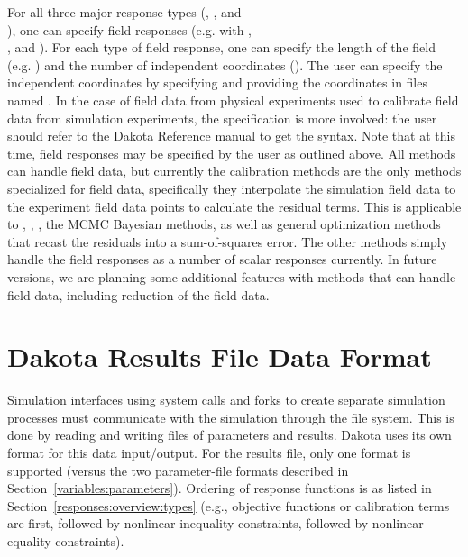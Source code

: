 For all three major response types (,
, and\\), one
can specify field responses (e.g. with ,\\
, and ).
For each type of field response, one can specify the length
of the field (e.g. ) and the number of
independent coordinates ().
The user can specify the independent coordinates by specifying
 and providing the coordinates in files
named .  In the case of field data
from physical experiments used to calibrate field data from simulation
experiments, the specification is more involved:  the user should refer
to the Dakota Reference manual to get the syntax.  Note that at this
time, field responses may be specified by the user as outlined above.
All methods can handle field data, but currently the calibration methods
are the only methods specialized for field data, specifically they
interpolate the simulation field data to the experiment field data points
to calculate the residual terms.  This is applicable to ,
, , the MCMC Bayesian methods,
as well as general optimization methods that recast the residuals into
a sum-of-squares error.  The other methods simply handle the field
responses as a number of scalar responses currently. In future versions,
we are planning some additional features with methods that can handle
field data, including reduction of the field data.

\section{Dakota Results File Data Format}\label{responses:results}

Simulation interfaces using system calls and forks to create
separate simulation processes must communicate with the simulation
through the file system. This is done by reading and
writing files of parameters and results. Dakota uses its own format
for this data input/output. For the results file, only one format is
supported (versus the two parameter-file formats described in
Section~\ref{variables:parameters}). Ordering of response functions is
as listed in Section~\ref{responses:overview:types} (e.g., objective
functions or calibration terms are first, followed by nonlinear
inequality constraints, followed by nonlinear equality constraints).

